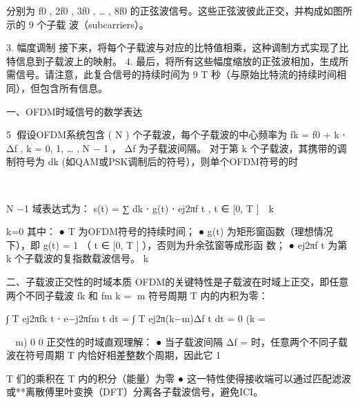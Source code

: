    分别为 f0 , 2f0 , 3f0 , … , 8f0 的正弦波信号。这些正弦波彼此正交，并构成如图所示的 9 个子载
   波（subcarriers）。
        ​       ​       ​   ​




3. 幅度调制
   接下来，将每个子载波与对应的比特值相乘，这种调制方式实现了比特信息到子载波上的映射。
4. 最后，将所有这些幅度缩放的正弦波相加，生成所需信号。请注意，此复合信号的持续时间为 9 T
   秒（与原始比特流的持续时间相同），但包含所有信息。

一、OFDM时域信号的数学表达

                                                              5
假设OFDM系统包含 ( N ) 个子载波，每个子载波的中心频率为
 fk = f0 + k ⋅ Δf , k = 0, 1, … , N − 1 ， Δf 为子载波间隔。
对于第 k 个子载波，其携带的调制符号为 dk (如QAM或PSK调制后的符号），则单个OFDM符号的时
     ​       ​




                                                         ​




                     N −1
域表达式为： s(t) = ∑ dk ⋅ g(t) ⋅ ej2πf t , t ∈ [0, T ]
                             ​   ​
                                                 k   ​




                     k=0
其中：
  ● T 为OFDM符号的持续时间；
  ● g(t) 为矩形窗函数（理想情况下），即 g(t) = 1 （ t ∈ [0, T ] ），否则为升余弦窗等成形函
    数；
  ● ej2πf t 为第 k 个子载波的复指数载波信号。
                 k



二、子载波正交性的时域本质
OFDM的关键特性是子载波在时域上正交，即任意两个不同子载波 fk 和 fm k = m 符号周期
T 内的内积为零：
                                                                 ​   ​




∫ T ej2πfk t ⋅ e−j2πfm t dt = ∫ T ej2π(k−m)Δf t dt = 0 (k =
         ​
                     ​   ​




                                             ​             m)
 0                                       0
正交性的时域直观理解：
 ● 当子载波间隔 Δf =         时，任意两个不同子载波在符号周期 T 内恰好相差整数个周期，因此它
                    1
                                     ​




                    T
   们的乘积在 T 内的积分（能量）为零
 ● 这一特性使得接收端可以通过匹配滤波或**离散傅里叶变换（DFT）分离各子载波信号，避免ICI。

